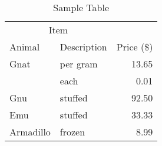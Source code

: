 
\begin{table}[htbp]
	\centering
	\caption{Sample Table}
	\label{tab:sample}
	\begin{tabular}{@{}llr@{}} \toprule
		\multicolumn{2}{c}{Item} \\ \cmidrule(r){1-2}
		Animal & Description & Price (\$)\\ \midrule
		Gnat & per gram & 13.65 \\
		& each & 0.01 \\
		Gnu & stuffed & 92.50 \\
		Emu & stuffed & 33.33 \\
		Armadillo & frozen & 8.99 \\ \bottomrule
		\end{tabular} 
\end{table}